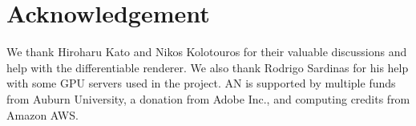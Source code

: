 \documentclass[10pt,twocolumn,letterpaper]{article}
\begin{document}
\section*{Acknowledgement}
We thank Hiroharu Kato and Nikos Kolotouros for their valuable discussions and help with the differentiable renderer.
We also thank Rodrigo Sardinas for his help with some GPU servers used in the project.
AN is supported by multiple funds from Auburn University, a donation from Adobe Inc., and computing credits from Amazon AWS.



{\small


}

\clearpage

\renewcommand{\thesection}{S\arabic{section}}
\renewcommand{\thesubsection}{\thesection.\arabic{subsection}}

\newcommand{\beginsupplementary}{%
            \setcounter{table}{0}
    \renewcommand{\thetable}{S\arabic{table}}%
            \setcounter{figure}{0}
    \renewcommand{\thefigure}{S\arabic{figure}}%
    \setcounter{section}{0}
}
\newcommand{\suptitle}{Supplementary materials for:\\\papertitle}

\newcommand{\toptitlebar}{
    \hrule height 4pt
    \vskip 0.25in
    \vskip -\parskip%
}
\newcommand{\bottomtitlebar}{
    \vskip 0.29in
    \vskip -\parskip%
    \hrule height 1pt
    \vskip 0.09in%
}


\beginsupplementary%
\end{document}
